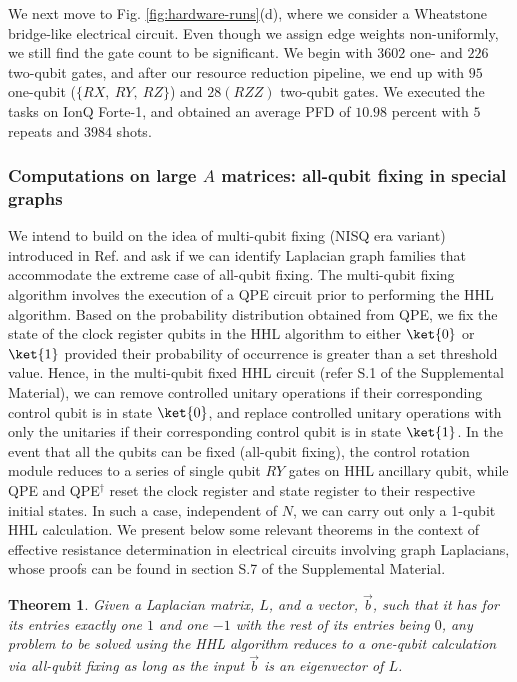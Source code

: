 \documentclass[%
 reprint,
 superscriptaddress,
 amsmath,amssymb,
 aps,
 pra,
floatfix,
nofootinbib,
]{revtex4-2}
\newtheorem{theorem}{Theorem}
\theoremstyle{definition}
\theoremstyle{remark}
\begin{document}
We next move to Fig. \ref{fig:hardware-runs}(d), where we consider a Wheatstone bridge-like electrical circuit. Even though we assign edge weights non-uniformly, we still find the gate count to be significant. We begin with $3602$ one- and $226$ two-qubit gates, and after our resource reduction pipeline, we end up with $95$ one-qubit ($\{RX,\ RY,\ RZ\}$) and $28 (RZZ)$ two-qubit gates. We executed the tasks on IonQ Forte-1, and obtained an average PFD of $10.98$ percent with $5$ repeats and $3984$ shots. \\ 

\subsubsection{Computations on large $A$ matrices: all-qubit fixing in special graphs} \label{app:symm}

We intend to build on the idea of multi-qubit fixing (NISQ era variant) introduced in Ref. \cite{nishanth2023adapt} and ask if we can identify Laplacian graph families that accommodate the extreme case of all-qubit fixing. The multi-qubit fixing algorithm involves the execution of a QPE circuit prior to performing the HHL algorithm. Based on the probability distribution obtained from QPE, we fix the state of the clock register qubits in the HHL algorithm to either $\ket{0}$ or $\ket{1}$ provided their probability of occurrence is greater than a set threshold value. Hence, in the multi-qubit fixed HHL circuit (refer S.1 of the Supplemental Material), we can remove controlled unitary operations if their corresponding control qubit is in state $\ket{0}$, and replace controlled unitary operations with only the unitaries if their corresponding control qubit is in state $\ket{1}$. In the event that all the qubits can be fixed (all-qubit fixing), the control rotation module reduces to a series of single qubit $RY$ gates on HHL ancillary qubit, while QPE and QPE$^{\dagger}$ reset the clock register and state register to their respective initial states. In such a case, independent of $N$, we can carry out only a 1-qubit HHL calculation. We present below some relevant theorems in the context of effective resistance determination in electrical circuits involving graph Laplacians, whose proofs can be found in section S.7 of the Supplemental Material. 

\begin{theorem} \label{th:lapmat} 
Given a Laplacian matrix, $L$, and a vector, $\vec{b}$, such that it has for its entries exactly one $1$ and one $-1$ with the rest of its entries being $0$, any problem to be solved using the HHL algorithm reduces to a one-qubit calculation via all-qubit fixing as long as the input $\vec{b}$ is an eigenvector of $L$. 
\end{theorem} 
\end{document}
